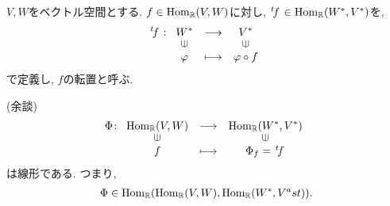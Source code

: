 \begin{definition}
  $V,W$をベクトル空間とする.
  $f\in \operatorname{Hom}_{\mathbb{R}}(V,W)$に対し,
  $\left.^{t}\!f\right.\in \operatorname{Hom}_{\mathbb{R}}(W^\ast,V^\ast)$を,
  \begin{align*}
    \transposed{f}\colon
    \Shazo{W^\ast}{V^\ast}
          {\varphi}{\varphi\circ f}
  \end{align*}
  で定義し, $f$の転置と呼ぶ.
\end{definition}

(余談)
\begin{align*}
  \Phi\colon
  \Shazo{\Hom_\RR(V,W)}{\Hom_\RR(W^\ast,V^\ast)}
        {f}{\Phi_f=\transposed{f}}
\end{align*}
は線形である.
つまり,
\begin{align*}
  \Phi\in\operatorname{Hom}_{\mathbb{R}}(\operatorname{Hom}_{\mathbb{R}}(V,W),\operatorname{Hom}_{\mathbb{R}}(W^\ast,V^ast)).
\end{align*}
